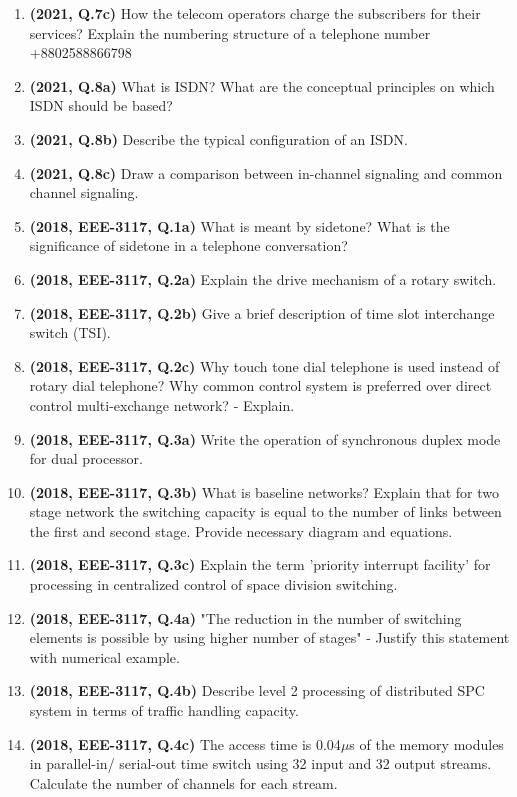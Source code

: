 \documentclass[12pt, a4paper]{article}
\begin{document}
\begin{enumerate}
		\item \textbf{(2021, Q.7c)} How the telecom operators charge the subscribers for their services? Explain the numbering structure of a telephone number +8802588866798
		\item \textbf{(2021, Q.8a)} What is ISDN? What are the conceptual principles on which ISDN should be based?
		\item \textbf{(2021, Q.8b)} Describe the typical configuration of an ISDN.
		\item \textbf{(2021, Q.8c)} Draw a comparison between in-channel signaling and common channel signaling.
		
		\item \textbf{(2018, EEE-3117, Q.1a)} What is meant by sidetone? What is the significance of sidetone in a telephone conversation?
		\item \textbf{(2018, EEE-3117, Q.2a)} Explain the drive mechanism of a rotary switch.
		\item \textbf{(2018, EEE-3117, Q.2b)} Give a brief description of time slot interchange switch (TSI).
		\item \textbf{(2018, EEE-3117, Q.2c)} Why touch tone dial telephone is used instead of rotary dial telephone? Why common control system is preferred over direct control multi-exchange network? - Explain.
		\item \textbf{(2018, EEE-3117, Q.3a)} Write the operation of synchronous duplex mode for dual processor.
		\item \textbf{(2018, EEE-3117, Q.3b)} What is baseline networks? Explain that for two stage network the switching capacity is equal to the number of links between the first and second stage. Provide necessary diagram and equations.
		\item \textbf{(2018, EEE-3117, Q.3c)} Explain the term 'priority interrupt facility' for processing in centralized control of space division switching.
		\item \textbf{(2018, EEE-3117, Q.4a)} "The reduction in the number of switching elements is possible by using higher number of stages" - Justify this statement with numerical example.
		\item \textbf{(2018, EEE-3117, Q.4b)} Describe level 2 processing of distributed SPC system in terms of traffic handling capacity.
		\item \textbf{(2018, EEE-3117, Q.4c)} The access time is 0.04$\mu$s of the memory modules in parallel-in/ serial-out time switch using 32 input and 32 output streams. Calculate the number of channels for each stream.

\end{enumerate}
\end{document}
